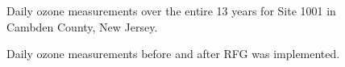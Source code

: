 \documentclass{article}
\begin{document}
\begin{figure}[h]

\caption{\label{fig:max_all3}Daily ozone measurements over the entire 13 years for Site 1001 in Cambden County, New Jersey.}
\end{figure}



\begin{figure}[h]

\caption{\label{fig:max_doy3}Daily ozone measurements before and after RFG was implemented.}
\end{figure}
\end{document}
